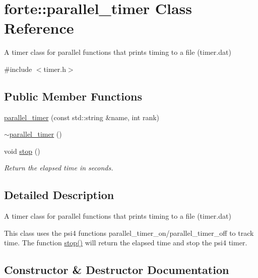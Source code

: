\hypertarget{classforte_1_1parallel__timer}{}\section{forte\+:\+:parallel\+\_\+timer Class Reference}
\label{classforte_1_1parallel__timer}


A timer class for parallel functions that prints timing to a file (timer.\+dat)  




{\ttfamily \#include $<$timer.\+h$>$}

\subsection*{Public Member Functions}
\begin{DoxyCompactItemize}
\item 
\mbox{\hyperlink{classforte_1_1parallel__timer_a94679c406fc0e1cb5e964b3d1c4128b5}{parallel\+\_\+timer}} (const std\+::string \&name, int rank)
\item 
\mbox{\hyperlink{classforte_1_1parallel__timer_abf4df15d53481277b7134fc74a7f1db3}{$\sim$parallel\+\_\+timer}} ()
\item 
void \mbox{\hyperlink{classforte_1_1parallel__timer_abacc218012f9ecd9a6f709dc40949948}{stop}} ()
\begin{DoxyCompactList}\small\item\em Return the elapsed time in seconds. \end{DoxyCompactList}\end{DoxyCompactItemize}


\subsection{Detailed Description}
A timer class for parallel functions that prints timing to a file (timer.\+dat) 

This class uses the psi4 functions parallel\+\_\+timer\+\_\+on/parallel\+\_\+timer\+\_\+off to track time. The function \mbox{\hyperlink{classforte_1_1parallel__timer_abacc218012f9ecd9a6f709dc40949948}{stop()}} will return the elapsed time and stop the psi4 timer. 

\subsection{Constructor \& Destructor Documentation}
\mbox{\label{classforte_1_1parallel__timer_a94679c406fc0e1cb5e964b3d1c4128b5}} 
